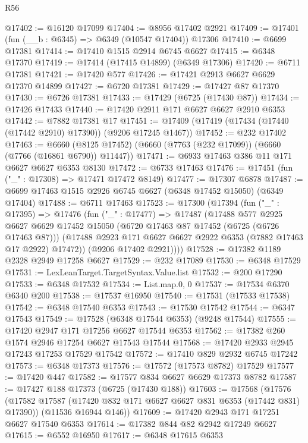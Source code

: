 \begin{lexlean}{R56}
\begin{coremodule}
@17402 := @16120 @17099
@17404 := @8956 @17402 @2921
@17409 := @17401 (fun (__b : @6345) => @6349 (@10547 @17404)) @17306
@17410 := @6699 @17381
@17414 := @17410 @1515 @2914 @6745 @6627
@17415 := @6348 @17370
@17419 := @17414 (@17415 @14899) (@6349 @17306)
@17420 := @6711 @17381
@17421 := @17420 @577
@17426 := @17421 @2913 @6627 @6629 @17370 @14899
@17427 := @6720 @17381
@17429 := @17427 @87 @17370
@17430 := @6726 @17381
@17433 := @17429 (@6725 (@17430 @87))
@17434 := @17426 @17433
@17440 := @17420 @2911 @171 @6627 @6627 @2910 @6353
@17442 := @7882 @17381 @17
@17451 := @17409 (@17419 (@17434 (@17440 (@17442 @2910) @17390)) (@9206 @17245 @1467))
@17452 := @232 @17402
@17463 := @6660 (@8125 @17452) (@6660 (@7763 (@232 @17099)) (@6660 (@7766 (@16861 @6790)) @11447))
@17471 := @6933 @17463 @386 @11 @171 @6627 @6627 @6353 @8130
@17472 := @6733 @17463
@17476 := @17451 (fun ("_" : @17308) => @17471 @17472 @8149)
@17477 := @17307 @6878
@17487 := @6699 @17463 @1515 @2926 @6745 @6627 (@6348 @17452 @15050) (@6349 @17404)
@17488 := @6711 @17463
@17523 := @17300
    (@17394
      (fun ("_" : @17395) =>
      @17476
        (fun ("_" : @17477) =>
        @17487
          (@17488
            @577
            @2925
            @6627
            @6629
            @17452
            @15050
            (@6720 @17463 @87 @17452 (@6725 (@6726 @17463 @87)))
            (@17488 @2923 @171 @6627 @6627 @2922 @6353 (@7882 @17463 @17 @2922) @17472))
          (@9206 @17402 @2921))))
@17528 := @17382 @1189 @2328 @2949 @17258 @6627
@17529 := @232 @17089
@17530 := @6348 @17529
@17531 := LexLeanTarget.TargetSyntax.Value.list
@17532 := @200 @17290
@17533 := @6348 @17532
@17534 := List.map.{0, 0}
@17537 := @17534 @6370 @6340 @200
@17538 := @17537 @16950
@17540 := @17531 (@17533 @17538)
@17542 := @6348 @17540 @6353
@17543 := @17530 @17542
@17544 := @6347 @17543
@17549 := @17528 (@6348 @17544 @6353) (@9248 @17544)
@17555 := @17420 @2947 @171 @17256 @6627 @17544 @6353
@17562 := @17382 @260 @1574 @2946 @17254 @6627 @17543 @17544
@17568 := @17420 @2933 @2945 @17243 @17253 @17529 @17542
@17572 := @17410 @829 @2932 @6745 @17242
@17573 := @6348 @17373
@17576 := @17572 (@17573 @8782) @17529
@17577 := @17420 @447
@17582 := @17577 @834 @6627 @6629 @17373 @8782
@17587 := @17427 @188 @17373 (@6725 (@17430 @188))
@17603 := @17568
    (@17576
      (@17582 @17587 (@17420 @832 @171 @6627 @6627 @831 @6353 (@17442 @831) @17390))
      (@11536 @16944 @146))
@17609 := @17420 @2943 @171 @17251 @6627 @17540 @6353
@17614 := @17382 @844 @82 @2942 @17249 @6627
@17615 := @6552 @16950
@17617 := @6348 @17615 @6353

\end{coremodule}
\end{lexlean}
